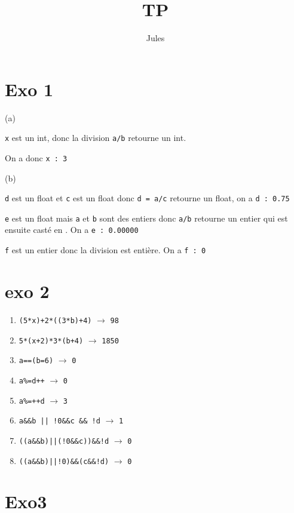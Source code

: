 \documentclass{article}
\title{TP}
\author{Jules}
\begin{document}
\maketitle



\section{Exo 1}

(a)

\texttt{x} est un int, donc la division \texttt{a/b} retourne un int.

On a donc \texttt{x : 3}

(b)

\texttt{d} est un float et \texttt{c} est un float donc \texttt{d = a/c}
retourne un float, on a \texttt{d : 0.75}

\texttt{e} est un float mais \texttt{a} et \texttt{b} sont des entiers donc 
\texttt{a/b} retourne un entier qui est ensuite casté en . On a \texttt{e : 0.00000}

\texttt{f} est un entier donc la division est entière. On a \texttt{f : 0}

\section{exo 2}

\begin{enumerate}
    \item \texttt{(5*x)+2*((3*b)+4)} $\rightarrow$ \texttt{98}
    \item \texttt{5*(x+2)*3*(b+4)} $\rightarrow$ \texttt{1850}
    \item \texttt{a==(b=6)} $\rightarrow$ \texttt{0}
    \item \texttt{a\%=d++} $\rightarrow$ \texttt{0}
    \item \texttt{a\%=++d} $\rightarrow$ \texttt{3}
    \item \texttt{a\&\&b || !0\&\&c \&\& !d} $\rightarrow$ \texttt{1}
    \item \texttt{((a\&\&b)||(!0\&\&c))\&\&!d} $\rightarrow$ \texttt{0}
    \item \texttt{((a\&\&b)||!0)\&\&(c\&\&!d)} $\rightarrow$ \texttt{0}
\end{enumerate}

\section{Exo3}
\end{document}
